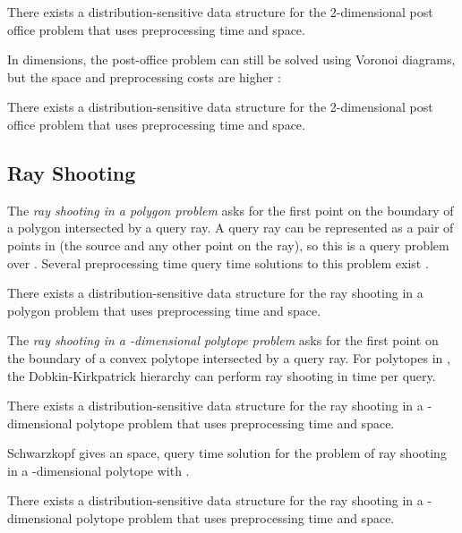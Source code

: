 \documentclass{patmorin}
\begin{document}
\begin{thm}
  There exists a distribution-sensitive data structure for the
  2-dimensional post office problem that uses  preprocessing
  time and  space.
\end{thm}

In  dimensions, the post-office problem can still be solved using
Voronoi diagrams, but the space and preprocessing costs are higher
\cite{c88postoffice}:

\begin{thm}
  There exists a distribution-sensitive data structure for the
  2-dimensional post office problem that uses 
  preprocessing time and space.
\end{thm}

\subsection{Ray Shooting}

The \emph{ray shooting in a polygon problem} asks for the first point
on the boundary of a polygon  intersected by a query ray.  A query
ray can be represented as a pair of points in  (the source and
any other point on the ray), so this is a query problem over .
Several  preprocessing time  query time solutions to
this problem exist \cite{cegghss94,hs95}.

\begin{thm}
  There exists a distribution-sensitive data structure for the ray shooting
  in a polygon problem that uses  preprocessing time and
   space.
\end{thm}

The \emph{ray shooting in a -dimensional polytope problem}
asks for the first point on the boundary of a convex polytope
 intersected by a query ray.  For polytopes in ,
the Dobkin-Kirkpatrick hierarchy \cite{dk83} can perform ray shooting
in  time per query.

\begin{thm}
  There exists a distribution-sensitive data structure for the
  ray shooting in a -dimensional polytope problem that uses
   preprocessing time and  space.
\end{thm}

Schwarzkopf \cite{s92} gives an  space,
 query time solution for the problem of ray shooting in a
-dimensional polytope with .

\begin{thm}
  There exists a distribution-sensitive data structure for the
  ray shooting in a -dimensional polytope problem that uses
   preprocessing time and space.
\end{thm}
\end{document}
